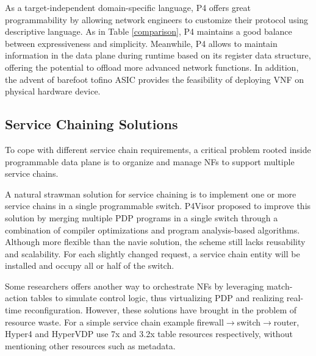 \documentclass[10pt, conference, letterpaper]{IEEEtran}
\begin{document}
As a target-independent domain-specific language, P4 offers great programmability by allowing network engineers to customize their protocol using descriptive language. As in Table \ref{comparison}, P4 maintains a good balance between expressiveness and simplicity. 
Meanwhile, P4 allows to maintain information in the data plane during runtime based on its register data structure, offering the potential to offload more advanced network functions. 
In addition, the advent of barefoot tofino ASIC provides the feasibility of deploying VNF on physical hardware device.

\subsection{Service Chaining Solutions}
To cope with different service chain requirements, a critical problem rooted inside programmable data plane is to organize and manage NFs to support multiple service chains. 

A natural strawman solution for service chaining is to implement one or more service chains in a single programmable switch. P4Visor proposed to improve this solution by merging multiple PDP programs in a single switch through a combination of compiler optimizations and program analysis-based algorithms. 
Although more flexible than the navie solution, the scheme still lacks reusability and scalability. For each slightly changed request, a service chain entity will be installed and occupy all or half of the switch.

Some researchers \cite{hancock2016hyper4} \cite{zhang2019hypervdp} offers another way to orchestrate NFs by leveraging match-action tables to simulate control logic, thus virtualizing PDP and realizing real-time reconfiguration. However, these solutions have brought in the problem of resource waste. For a simple service chain example firewall$\rightarrow$switch$\rightarrow$router, Hyper4\cite{hancock2016hyper4} and HyperVDP\cite{zhang2019hypervdp} use 7x and 3.2x table resources respectively, without mentioning other resources such as metadata.
\end{document}
